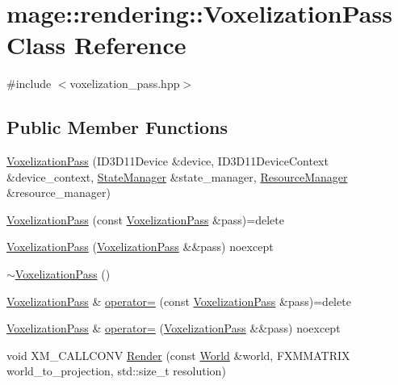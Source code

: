 \hypertarget{classmage_1_1rendering_1_1_voxelization_pass}{}\section{mage\+:\+:rendering\+:\+:Voxelization\+Pass Class Reference}
\label{classmage_1_1rendering_1_1_voxelization_pass}


{\ttfamily \#include $<$voxelization\+\_\+pass.\+hpp$>$}

\subsection*{Public Member Functions}
\begin{DoxyCompactItemize}
\item 
\mbox{\hyperlink{classmage_1_1rendering_1_1_voxelization_pass_a5ffb9a465e954b6795bc49dfdd8a21d8}{Voxelization\+Pass}} (I\+D3\+D11\+Device \&device, I\+D3\+D11\+Device\+Context \&device\+\_\+context, \mbox{\hyperlink{classmage_1_1rendering_1_1_state_manager}{State\+Manager}} \&state\+\_\+manager, \mbox{\hyperlink{classmage_1_1rendering_1_1_resource_manager}{Resource\+Manager}} \&resource\+\_\+manager)
\item 
\mbox{\hyperlink{classmage_1_1rendering_1_1_voxelization_pass_a74f9898700c2d2877ec663fe23a85670}{Voxelization\+Pass}} (const \mbox{\hyperlink{classmage_1_1rendering_1_1_voxelization_pass}{Voxelization\+Pass}} \&pass)=delete
\item 
\mbox{\hyperlink{classmage_1_1rendering_1_1_voxelization_pass_abbdf28fc21b6b4fe4eebf8ed02ac015d}{Voxelization\+Pass}} (\mbox{\hyperlink{classmage_1_1rendering_1_1_voxelization_pass}{Voxelization\+Pass}} \&\&pass) noexcept
\item 
\mbox{\hyperlink{classmage_1_1rendering_1_1_voxelization_pass_ab989ce6ec60745d7339a1288554dd400}{$\sim$\+Voxelization\+Pass}} ()
\item 
\mbox{\hyperlink{classmage_1_1rendering_1_1_voxelization_pass}{Voxelization\+Pass}} \& \mbox{\hyperlink{classmage_1_1rendering_1_1_voxelization_pass_a30bf15dac8660764cd1342a4f397e47e}{operator=}} (const \mbox{\hyperlink{classmage_1_1rendering_1_1_voxelization_pass}{Voxelization\+Pass}} \&pass)=delete
\item 
\mbox{\hyperlink{classmage_1_1rendering_1_1_voxelization_pass}{Voxelization\+Pass}} \& \mbox{\hyperlink{classmage_1_1rendering_1_1_voxelization_pass_ac7beb95fbf6fd85355703854ac282e91}{operator=}} (\mbox{\hyperlink{classmage_1_1rendering_1_1_voxelization_pass}{Voxelization\+Pass}} \&\&pass) noexcept
\item 
void X\+M\+\_\+\+C\+A\+L\+L\+C\+O\+NV \mbox{\hyperlink{classmage_1_1rendering_1_1_voxelization_pass_a3989c3964a96ed4f13ba3874cadf69a6}{Render}} (const \mbox{\hyperlink{classmage_1_1rendering_1_1_world}{World}} \&world, F\+X\+M\+M\+A\+T\+R\+IX world\+\_\+to\+\_\+projection, std\+::size\+\_\+t resolution)
\end{DoxyCompactItemize}
